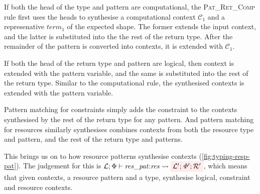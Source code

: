 If both the head of the type and pattern are computational, the
\textsc{Pat\_Ret\_Comp} rule first uses the heads to synthesise a computational
context $\mathcal{C}_1$ and a represenative $\mathit{term}_1$ of the expected
shape. The former extends the input context, and the latter is substituted into
the the rest of the return type. After the remainder of the pattern is
converted into contexts, it is extended with $\mathcal{C}_1$.

If both the head of the return type and pattern are logical, then context is
extended with the pattern variable, and the same is
substituted into the rest of the return type. Similar to the computational
rule, the synthesised contexts is extended with the pattern variable.

Pattern matching for constraints simply adds the constraint to the contexts
synthesised by the rest of the return type for any pattern. And pattern
matching for resources similarly synthesises combines contexts from both the
resource type and pattern, and the rest of the return type and patterns.

This brings us on to how resource patterns synthesise contexts
(\cref{fig:typing-resp-pat}). The judgement for this is $\mathcal{L}; \Phi
\vdash \mathit{res\_pat}{:}\mathit{res} \rightsquigarrow \outpol{\mathcal{L}';
\Phi'; \mathcal{R}'}$, which means that given contexts, a resource pattern and a type, synthesise
logical, constraint and resource contexts.


